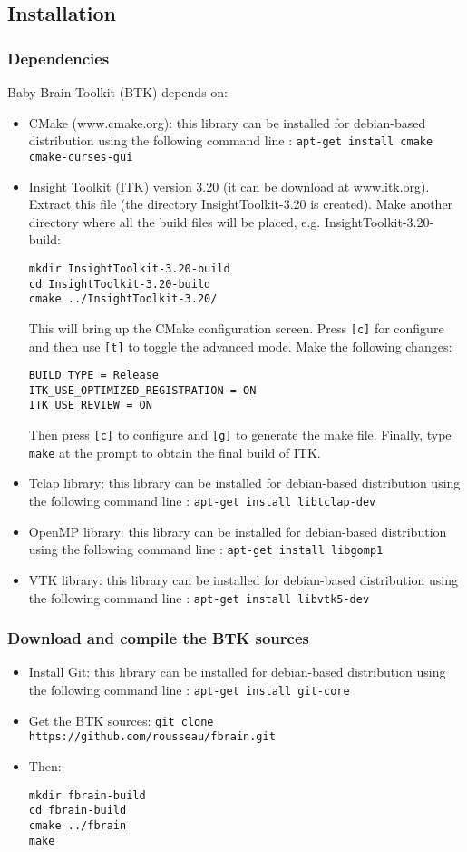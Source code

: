 \documentclass[a4paper,10pt]{article}
\begin{document}
\subsection{Installation}

\subsubsection{Dependencies}

Baby Brain Toolkit (BTK) depends on:
\begin{itemize}
 \item CMake (www.cmake.org): this library can be installed for debian-based
distribution using the following command line : \texttt{apt-get install
cmake cmake-curses-gui}
 \item Insight Toolkit (ITK) version 3.20 (it can be download at www.itk.org). Extract this file (the directory InsightToolkit-3.20 is created). Make another directory where all the build files will be placed, e.g. InsightToolkit-3.20-build:
\begin{verbatim}
mkdir InsightToolkit-3.20-build
cd InsightToolkit-3.20-build
cmake ../InsightToolkit-3.20/
\end{verbatim}
This will bring up the CMake configuration screen. Press \texttt{[c]} for configure and then use \texttt{[t]} to toggle the advanced mode. Make the following changes:
\begin{verbatim}
BUILD_TYPE = Release
ITK_USE_OPTIMIZED_REGISTRATION = ON
ITK_USE_REVIEW = ON
\end{verbatim}
Then press \texttt{[c]} to configure and \texttt{[g]} to generate the make file. Finally, type \texttt{make} at the prompt to obtain the final build of ITK.
 \item Tclap library: this library can be installed for debian-based
distribution using the following command line : \texttt{apt-get install
libtclap-dev}
 \item OpenMP library: this library can be installed for debian-based
distribution using the following command line : \texttt{apt-get install
libgomp1}
 \item VTK library: this library can be installed for debian-based
distribution using the following command line : \texttt{apt-get install
libvtk5-dev}
\end{itemize}

\subsubsection{Download and compile the BTK sources}
\begin{itemize}
 \item Install Git: this library can be installed for debian-based distribution using the following command line : \texttt{apt-get install git-core}
 \item Get the BTK sources: \texttt{git clone https://github.com/rousseau/fbrain.git }
 \item Then:
\begin{verbatim}
mkdir fbrain-build
cd fbrain-build
cmake ../fbrain
make
\end{verbatim}
\end{itemize}
\end{document}

